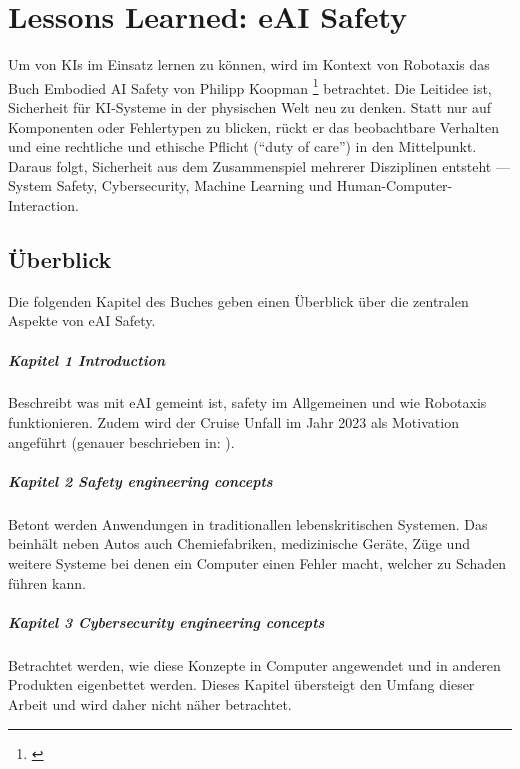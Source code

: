 \chapter{Lessons Learned: eAI Safety}\label{chap:automotiv}

Um von KIs im Einsatz lernen zu können, wird im Kontext von Robotaxis das Buch 
Embodied AI Safety von Philipp Koopman \footnote{ \parencite{Koopman:2025:EAI}}
betrachtet. Die Leitidee ist, Sicherheit für KI-Systeme 
in der physischen Welt neu zu denken. Statt nur auf Komponenten oder Fehlertypen 
zu blicken, rückt er das beobachtbare Verhalten und eine rechtliche und ethische Pflicht 
(``duty of care'') in den Mittelpunkt. Daraus folgt, Sicherheit aus dem 
Zusammenspiel mehrerer Disziplinen entsteht — System Safety, Cybersecurity, Machine Learning 
und Human-Computer-Interaction.

\section{Überblick}
Die folgenden Kapitel des Buches geben einen Überblick über die zentralen Aspekte von eAI Safety.

\paragraph{Kapitel 1 Introduction}
Beschreibt was mit eAI gemeint ist, safety im Allgemeinen und wie Robotaxis funktionieren. 
Zudem wird der Cruise Unfall im Jahr 2023 als Motivation angeführt (genauer beschrieben in: ).

\paragraph{Kapitel 2 Safety engineering concepts}
Betont werden Anwendungen in traditionallen lebenskritischen Systemen. 
Das beinhält neben Autos auch Chemiefabriken, medizinische Geräte, Züge und weitere Systeme 
bei denen ein Computer einen Fehler macht, welcher zu Schaden führen kann. 

\paragraph{Kapitel 3 Cybersecurity engineering concepts}
Betrachtet werden, wie diese Konzepte in Computer angewendet und in anderen Produkten eigenbettet werden. 
Dieses Kapitel übersteigt den Umfang dieser Arbeit und wird daher nicht näher betrachtet.

